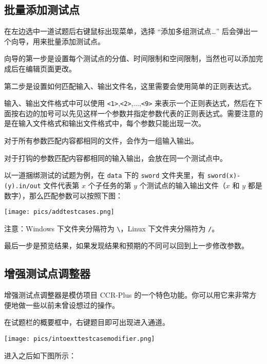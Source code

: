 \documentclass[UTF-8]{ctexart}
\begin{document}
    \subsection{批量添加测试点}

    在左边选中一道试题后右键鼠标出现菜单，选择 “添加多组测试点…” 后会弹出一个向导，用来批量添加测试点。

    向导的第一步是设置每个测试点的分值、时间限制和空间限制，当然也可以添加完成后在编辑页面更改。

    第二步是设置如何匹配输入、输出文件名，这里需要会使用简单的正则表达式。

    输入、输出文件格式中可以使用 \texttt{<1>},\texttt{<2>},...,\texttt{<9>} 来表示一个正则表达式，然后在下面按右边的加号可以先见这样一个参数并指定参数代表的正则表达式。需要注意的是在输入文件格式和输出文件格式中，每个参数只能出现一次。

    对于所有参数匹配内容都相同的文件，会作为一组输入输出。

    对于打钩的参数匹配内容都相同的输入输出，会放在同一个测试点中。

    以一道捆绑测试的试题为例，在 \texttt{data} 下的 \texttt{sword} 文件夹里，有 \texttt{sword(x)-(y).in/out} 文件代表第 $x$ 个子任务的第 $y$ 个测试点的输入输出文件（$x$ 和 $y$ 都是数字），那么匹配参数可以按照下图：

    \begin{center}
        \texttt{[image: pics/addtestcases.png]}
    \end{center}

    注意：Windows 下文件夹分隔符为 \texttt{\textbackslash}，Linux 下文件夹分隔符为 \texttt{/}。

    最后一步是预览结果，如果发现结果和预期的不同可以回到上一步修改参数。

    \subsection{增强测试点调整器}

    增强测试点调整器是模仿项目 CCR-Plus 的一个特色功能。你可以用它来非常方便地做一些以前未曾设想过的操作。

    在试题栏的概要框中，右键题目即可出现进入通道。

    \begin{center}
        \texttt{[image: pics/intoexttestcasemodifier.png]}
    \end{center}

    进入之后如下图所示：
\end{document}
